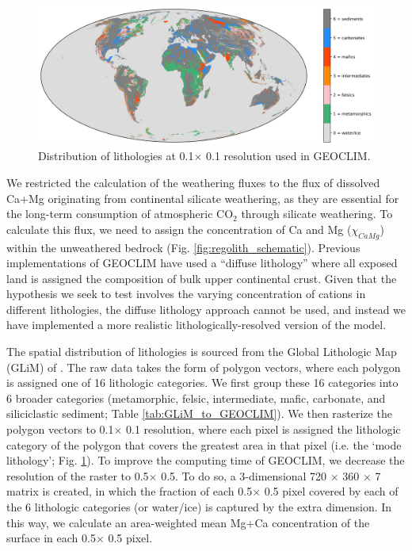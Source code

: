 \documentclass[11pt,letterpaper]{article}
\newcommand{\degrees}{\textdegree\xspace}
\newcommand{\COtwo}{CO$_{2}$\xspace}
\begin{document}
\begin{figure}[h!]
    \centering
    \includegraphics[width=1\textwidth]{Manuscript/Figures/world_lithology.jpg}
    \caption{Distribution of lithologies at 0.1\degrees $\times$ 0.1\degrees resolution used in GEOCLIM.}
    \label{fig:world_lithology}
\end{figure}

We restricted the calculation of the weathering fluxes to the flux of dissolved Ca+Mg originating from continental silicate weathering, as they are essential for the long-term consumption of atmospheric \COtwo through silicate weathering. To calculate this flux, we need to assign the concentration of Ca and Mg ($\chi_{CaMg}$) within the unweathered bedrock (Fig. \ref{fig:regolith_schematic}). Previous implementations of GEOCLIM have used a ``diffuse lithology'' where all exposed land is assigned the composition of bulk upper continental crust. Given that the hypothesis we seek to test involves the varying concentration of cations in different lithologies, the diffuse lithology approach cannot be used, and instead we have implemented a more realistic lithologically-resolved version of the model.

The spatial distribution of lithologies is sourced from the Global Lithologic Map (GLiM) of \citet{Hartmann2012a}. The raw data takes the form of polygon vectors, where each polygon is assigned one of 16 lithologic categories. We first group these 16 categories into 6 broader categories (metamorphic, felsic, intermediate, mafic, carbonate, and siliciclastic sediment; Table \ref{tab:GLiM_to_GEOCLIM}). We then rasterize the polygon vectors to 0.1\degrees $\times$ 0.1\degrees resolution, where each pixel is assigned the lithologic category of the polygon that covers the greatest area in that pixel (i.e. the `mode lithology'; Fig. \ref{fig:world_lithology}). To improve the computing time of GEOCLIM, we decrease the resolution of the raster to 0.5\degrees $\times$ 0.5\degrees. To do so, a 3-dimensional 720 $\times$ 360 $\times$ 7 matrix is created, in which the fraction of each 0.5\degrees $\times$ 0.5\degrees pixel covered by each of the 6 lithologic categories (or water/ice) is captured by the extra dimension. In this way, we calculate an area-weighted mean Mg+Ca concentration of the surface in each 0.5\degrees $\times$ 0.5\degrees pixel.
\end{document}
